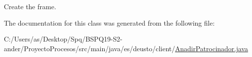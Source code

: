 Create the frame. 

The documentation for this class was generated from the following file\+:\begin{DoxyCompactItemize}
\item 
C\+:/\+Users/as/\+Desktop/\+Spq/\+B\+S\+P\+Q19-\/\+S2-\/ander/\+Proyecto\+Procesos/src/main/java/es/deusto/client/\mbox{\hyperlink{_anadir_patrocinador_8java}{Anadir\+Patrocinador.\+java}}\end{DoxyCompactItemize}
